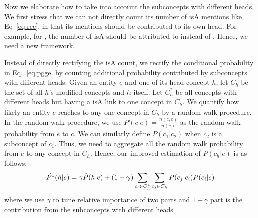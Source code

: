 %
Now we elaborate how to take into account the subconcepts with different heads. 
We first stress that we can not directly count its number of isA mentions like Eq~\ref{eq:rec}. 
in that its mentions should be contributed to its own head. 
For example, for , the number of  isA  should be attributed to  instead of .
Hence, we need a new framework.

Instead of directly rectifying the isA count, we rectify the conditional probability in Eq.~\ref{eq:pgge} by counting additional probability contributed by subconcepts with different heads. Given an entity $e$ and one of its head concept $h$, let $C_h$ be the set of all $h$'s modified concepts and $h$ itself. Let $C^*_h$ be all concepts with different heads but having a isA link to one concept in $C_h$. We quantify how likely an entity $e$ reaches to any one concept in $C_h$ by a random walk procedure. In the random walk procedure, we use $P(c|e)=\frac{n(c,e)}{n(e)}$ as the random walk probability from $e$ to $c$. We can similarly define $P(c_1|c_2)$ when $c_2$ is a subconcept of $c_1$.  Thus, we need to aggregate all the random walk probability from $e$ to any concept in $C_h$.
Hence, our improved estimation of $P({c_h}|e)$ is as follows:
\begin{equation}
\small
\hat{P^*}({h}|e) = \gamma \hat{P}({h}|e)+ (1-\gamma) \sum_{c_i\in C^*_h}\sum_{ c_j\in C_h} P(c_j|c_i) P(c_i|e)
\label{eq:pgge}
\end{equation}
where we use $\gamma$ to tune relative importance of two parts and $1-\gamma$ part is the contribution from the subconcepts with different heads.


